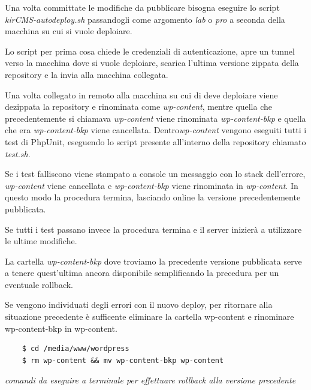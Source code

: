 Una volta committate le modifiche da pubblicare bisogna eseguire lo script \emph{kirCMS-autodeploy.sh} passandogli come argomento
\emph{lab} o \emph{pro} a seconda della macchina su cui si vuole deploiare.

Lo script per prima cosa chiede le credenziali di autenticazione, apre un tunnel verso la macchina dove si vuole deploiare, scarica l'ultima
versione zippata della repository e la invia alla macchina collegata.

Una volta collegato in remoto alla macchina su cui di deve deploiare viene dezippata la repository e rinominata come \emph{wp-content}, mentre
quella che precedentemente si chiamava \emph{wp-content} viene rinominata \emph{wp-content-bkp} e quella che era \emph{wp-content-bkp}
viene cancellata.
Dentro\emph{wp-content} vengono eseguiti tutti i test di PhpUnit, eseguendo lo script presente all'interno della repository chiamato \emph{test.sh}.

Se i test falliscono viene stampato a console un messaggio con lo stack dell'errore, \emph{wp-content} viene cancellata e \emph{wp-content-bkp}
viene rinominata in \emph{wp-content}. In questo modo la procedura termina, lasciando online
la versione precedentemente pubblicata.

Se tutti i test passano invece la procedura termina e il server inizierà a
utilizzare le ultime modifiche.

La cartella \emph{wp-content-bkp} dove troviamo la precedente versione pubblicata serve a tenere quest'ultima ancora disponibile semplificando la precedura per un eventuale rollback. 

Se vengono individuati degli errori con il nuovo deploy, per ritornare alla situazione precedente è sufficente eliminare la cartella wp-content
e rinominare wp-content-bkp in wp-content.

\begin{verbatim}
	$ cd /media/www/wordpress 
	$ rm wp-content && mv wp-content-bkp wp-content
\end{verbatim}
\emph{comandi da eseguire a terminale per effettuare rollback alla versione precedente}

\newpage 

